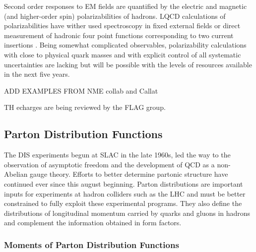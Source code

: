 Second order responses to EM fields are quantified by the electric and magnetic (and higher-order spin) polarizabilities of hadrons. LQCD calculations of polarizabilities have wither used spectroscopy in fixed external fields \cite{REF:ExtFields} or direct measurement of hadronic four point functions corresponding to two current insertions \cite{Ref:TwoCur}. Being somewhat complicated observables, polarizability calculations with close to physical quark masses and with explicit control of all systematic uncertainties are lacking but will be possible with the levels of resources available in the next five years.


ADD EXAMPLES FROM NME collab and Callat

TH echarges are being reviewed by the FLAG group.

\subsection{Parton Distribution Functions}



The DIS experiments begun at SLAC in the late 1960s, led the way to the observation of asymptotic freedom and the development of QCD as a non-Abelian gauge theory. Efforts to better determine partonic structure have continued ever since this august beginning. Parton distributions are important inputs for experiments at hadron colliders such as the LHC and must be better constrained to fully exploit these experimental programs. They also define the distributions of longitudinal momentum carried by quarks and gluons in hadrons and complement the information obtained in form factors.


\subsubsection{Moments of Parton Distribution Functions}

